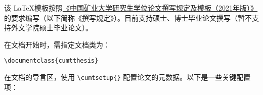 
该 \LaTeX 模板按照\href{https://gs.cumt.edu.cn/info/1049/3149.htm}{《中国矿业大学研究生学位论文撰写规定及模板（2021年版）》}的要求编写（以下简称《撰写规定》）。目前支持硕士、博士毕业论文撰写（暂不支持外文学院硕士毕业论文）。

在文档开始时，需指定文档类为：
\begin{center}
    \texttt{\textbackslash documentclass\{cumtthesis\}}
\end{center}


\label{section: metadata configuration}
在文档的导言区，使用 \texttt{\textbackslash cumtsetup\{\}} 配置论文的元数据。以下是一些关键配置项：


